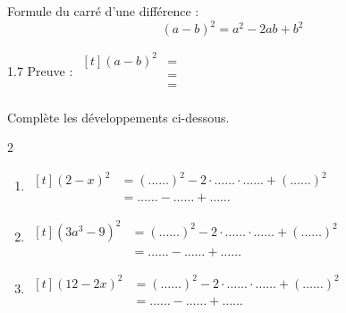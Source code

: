 \documentclass[../../syllabus_2.tex]{subfiles}
\begin{document}
Formule du carré d'une différence :
\begin{equation*}
  \left(a-b\right)^2=a^2-2ab+b^2
\end{equation*}

\begin{spacing}{1.7}
  Preuve : $
    \begin{aligned}[t]
      \left(a-b\right)^2
       & = \\
       & = \\
       & = \\
    \end{aligned}
  $
\end{spacing}

\begin{exercise}
  Complète les développements ci-dessous.
  \begin{spacing}{2}
    \begin{enumerate}[itemsep=0.5cm]
      \item $
              \begin{aligned}[t]
                \left(2-x\right)^2 & = \left(\ldots \ldots\right)^2 - 2 \cdot  \ldots \ldots \cdot  \ldots \ldots + \left( \ldots \ldots\right)^2 \\
                                   & =  \ldots \ldots -  \ldots \ldots +  \ldots \ldots
              \end{aligned}
            $
      \item $
              \begin{aligned}[t]
                \left(3a^3-9\right)^2
                 & = \left( \ldots \ldots\right)^2 - 2 \cdot  \ldots \ldots \cdot  \ldots \ldots + \left( \ldots \ldots\right)^2 \\
                 & =  \ldots \ldots -  \ldots \ldots +  \ldots \ldots
              \end{aligned}
            $
      \item $
              \begin{aligned}[t]
                \left(12-2x\right)^2
                 & = \left( \ldots \ldots\right)^2 - 2 \cdot  \ldots \ldots \cdot  \ldots \ldots + \left( \ldots \ldots\right)^2 \\
                 & =  \ldots \ldots -  \ldots \ldots +  \ldots \ldots
              \end{aligned}
            $
    \end{enumerate}
  \end{spacing}
\end{exercise}
\end{document}
